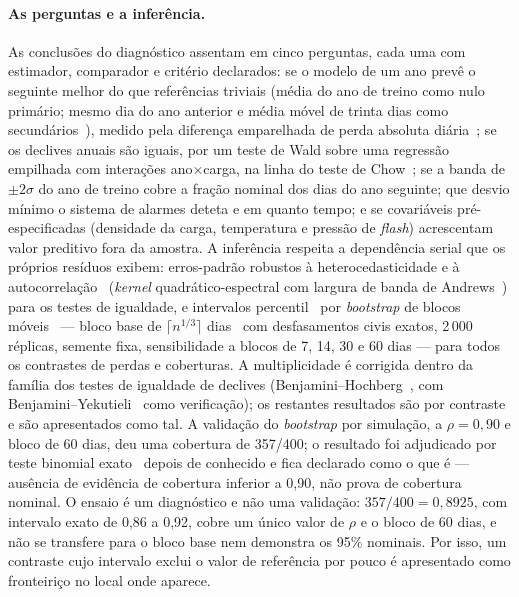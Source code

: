 \paragraph{As perguntas e a inferência.} As conclusões do diagnóstico
assentam em cinco perguntas, cada uma com estimador, comparador e
critério declarados: se o modelo de um ano prevê o seguinte melhor do que
referências triviais (média do ano de treino como nulo primário; mesmo dia
do ano anterior e média móvel de trinta dias como secundários~\cite{HyndmanKoehler2006}), medido
pela diferença emparelhada de perda absoluta diária~\cite{DieboldMariano1995,HarveyLeybourneNewbold1997}; se os declives anuais
são iguais, por um teste de Wald sobre uma regressão empilhada com
interações ano$\times$carga, na linha do teste de Chow~\cite{Chow1960}; se a banda de $\pm2\sigma$ do ano de treino
cobre a fração nominal dos dias do ano seguinte; que desvio mínimo o
sistema de alarmes deteta e em quanto tempo; e se covariáveis
pré-especificadas (densidade da carga, temperatura e pressão de
\emph{flash}) acrescentam valor preditivo fora da amostra. A inferência
respeita a dependência serial que os próprios resíduos exibem: erros-padrão
robustos à heterocedasticidade e à autocorrelação~\cite{NeweyWest1987}
(\emph{kernel} quadrático-espectral com largura de banda de
Andrews~\cite{Andrews1991}) para os testes de igualdade, e intervalos percentil~\cite{Efron1979,EfronTibshirani1993} por
\emph{bootstrap} de blocos móveis~\cite{Kunsch1989,Lahiri2003} --- bloco
base de $\lceil n^{1/3}\rceil$ dias~\cite{HallHorowitzJing1995} com
desfasamentos civis exatos, 2\,000 réplicas, semente fixa, sensibilidade a blocos de 7, 14,
30 e 60 dias --- para todos os contrastes de perdas e coberturas.  A multiplicidade é corrigida dentro da
família dos testes de igualdade de declives (Benjamini--Hochberg~\cite{BenjaminiHochberg1995}, com
Benjamini--Yekutieli~\cite{BenjaminiYekutieli2001} como verificação); os restantes resultados são por
contraste e são apresentados como tal. A validação do \emph{bootstrap} por
simulação, a $\rho = 0{,}90$ e bloco de 60 dias, deu uma cobertura de
357/400; o resultado foi adjudicado por teste binomial exato~\cite{ClopperPearson1934}
depois de conhecido e fica declarado como o que é --- ausência de evidência de
cobertura inferior a 0,90, não prova de cobertura nominal. O ensaio é um
diagnóstico e não uma validação: $357/400 = 0{,}8925$, com intervalo exato de
0,86 a 0,92, cobre um único valor de $\rho$ e o bloco de 60 dias, e não se
transfere para o bloco base nem demonstra os 95\% nominais. Por isso, um
contraste cujo intervalo exclui o valor de referência por pouco é
apresentado como fronteiriço no local onde aparece.

